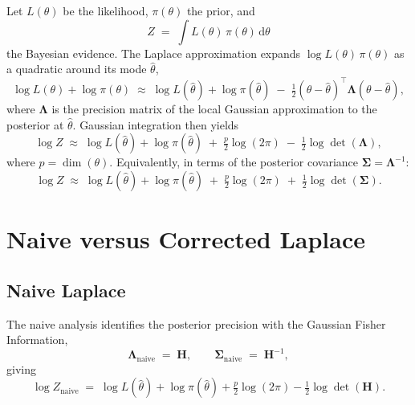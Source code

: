 \documentclass[11pt]{article}
\begin{document}
Let $L(\theta)$ be the likelihood, $\pi(\theta)$ the prior, and
\begin{equation}
Z
\;=\;
\int L(\theta)\,\pi(\theta)\,\mathrm{d}\theta
\end{equation}
the Bayesian evidence. The Laplace approximation expands $\log L(\theta)\,\pi(\theta)$ as a quadratic around its mode $\hat\theta$,
\begin{equation}
\log L(\theta) + \log\pi(\theta)
\;\approx\;
\log L(\hat\theta) + \log\pi(\hat\theta)
\;-\;
\tfrac{1}{2}(\theta - \hat\theta)^\top \boldsymbol\Lambda (\theta - \hat\theta),
\end{equation}
where $\boldsymbol\Lambda$ is the precision matrix of the local Gaussian approximation to the posterior at $\hat\theta$. Gaussian integration then yields
\begin{equation}
\log Z
\;\approx\;
\log L(\hat\theta) + \log\pi(\hat\theta)
\;+\;
\tfrac{p}{2}\log(2\pi)
\;-\;
\tfrac{1}{2}\log\det(\boldsymbol\Lambda),
\label{eq:laplace-precision}
\end{equation}
where $p = \dim(\theta)$. Equivalently, in terms of the posterior covariance $\boldsymbol\Sigma = \boldsymbol\Lambda^{-1}$:
\begin{equation}
\log Z
\;\approx\;
\log L(\hat\theta) + \log\pi(\hat\theta)
\;+\;
\tfrac{p}{2}\log(2\pi)
\;+\;
\tfrac{1}{2}\log\det(\boldsymbol\Sigma).
\label{eq:laplace-cov}
\end{equation}

\section{Naive versus Corrected Laplace}

\subsection{Naive Laplace}

The naive analysis identifies the posterior precision with the Gaussian Fisher Information,
\begin{equation}
\boldsymbol\Lambda_{\mathrm{naive}}
\;=\;
\mathbf H,
\qquad
\boldsymbol\Sigma_{\mathrm{naive}}
\;=\;
\mathbf H^{-1},
\end{equation}
giving
\begin{equation}
\log Z_{\mathrm{naive}}
\;=\;
\log L(\hat\theta)
+ \log\pi(\hat\theta)
+ \tfrac{p}{2}\log(2\pi)
- \tfrac{1}{2}\log\det(\mathbf H).
\label{eq:naive-Z}
\end{equation}
\end{document}
